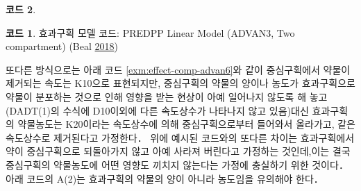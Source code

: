 \documentclass[
  10pt,
  krantz2,
  a4paper]{krantz}
\theoremstyle{definition}
\theoremstyle{definition}
\newtheorem{example}{코드}[chapter]
\theoremstyle{definition}
\theoremstyle{remark}
\begin{document}
\begin{example}
\begin{example}

\protect\hypertarget{exm:effect-model-code}{}{\label{exm:effect-model-code} }효과구획 모델 코드: PREDPP Linear Model (ADVAN3, Two compartment) (Beal \protect\hyperlink{ref-nonmem}{2018})

\end{example}
\end{example}

또다른 방식으로는 아래 코드 \ref{exm:effect-comp-advan6}와 같이 중심구획에서 약물이 제거되는 속도는 K10으로 표현되지만, 중심구획의 약물의 양이나 농도가 효과구획으로 약물이 분포하는 것으로 인해 영향을 받는 현상이 아예 일어나지 않도록 해 놓고(DADT(1)의 수식에 D10이외에 다른 속도상수가 나타나지 않고 있음)대신 효과구획의 약물농도는 K20이라는 속도상수에 의해 중심구획으로부터 들어와서 올라가고, 같은 속도상수로 제거된다고 가정한다． 위에 예시된 코드와의 또다른 차이는 효과구획에서 약이 중심구획으로 되돌아가지 않고 아예 사라져 버린다고 가정하는 것인데,이는 결국 중심구획의 약물농도에 어떤 영향도 끼치지 않는다는 가정에 충실하기 위한 것이다． 아래 코드의 A(2)는 효과구획의 약물의 양이 아니라 농도임을 유의해야 한다．
\end{document}
